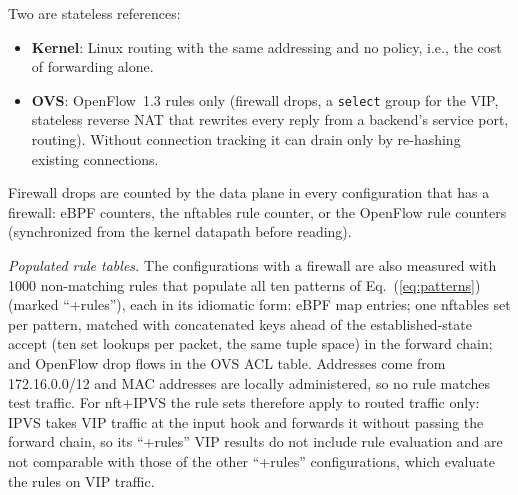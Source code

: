 \documentclass[conference]{IEEEtran}
\begin{document}
Two are stateless references:
\begin{itemize}
\item \textbf{Kernel}: Linux routing with the same addressing and no policy,
i.e., the cost of forwarding alone.
\item \textbf{OVS}: OpenFlow~1.3 rules only (firewall drops, a \texttt{select}
group for the VIP, stateless reverse NAT that rewrites every reply from a
backend's service port, routing). Without connection tracking it can drain
only by re-hashing existing connections.
\end{itemize}
Firewall drops are counted by the data plane in every configuration that has
a firewall: eBPF counters, the nftables rule counter, or the OpenFlow rule
counters (synchronized from the kernel datapath before reading).

\textit{Populated rule tables.} The configurations with a firewall are also
measured with 1000 non-matching rules that populate all ten patterns of
Eq.~(\ref{eq:patterns}) (marked ``+rules''), each in its idiomatic form: eBPF
map entries; one nftables set per pattern, matched with concatenated keys
ahead of the established-state accept (ten set lookups per packet, the same
tuple space) in the forward chain; and OpenFlow drop flows in the OVS ACL table. Addresses come
from 172.16.0.0/12 and MAC addresses are locally administered, so no rule
matches test traffic. For nft+IPVS the rule sets therefore apply to routed
traffic only: IPVS takes VIP traffic at the input hook and forwards it
without passing the forward chain, so its ``+rules'' VIP results do not
include rule evaluation and are not comparable with those of the other
``+rules'' configurations, which evaluate the rules on VIP traffic.
\end{document}
